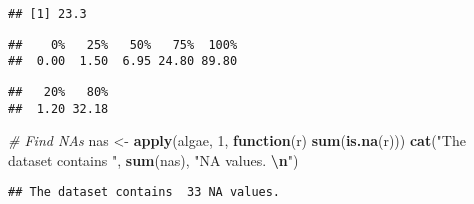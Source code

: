 \documentclass[
]{article}
\newenvironment{Shaded}{\begin{snugshade}}{\end{snugshade}}
\newcommand{\AttributeTok}[1]{\textcolor[rgb]{0.13,0.29,0.53}{#1}}
\newcommand{\CommentTok}[1]{\textcolor[rgb]{0.56,0.35,0.01}{\textit{#1}}}
\newcommand{\ControlFlowTok}[1]{\textcolor[rgb]{0.13,0.29,0.53}{\textbf{#1}}}
\newcommand{\DecValTok}[1]{\textcolor[rgb]{0.00,0.00,0.81}{#1}}
\newcommand{\FloatTok}[1]{\textcolor[rgb]{0.00,0.00,0.81}{#1}}
\newcommand{\FunctionTok}[1]{\textcolor[rgb]{0.13,0.29,0.53}{\textbf{#1}}}
\newcommand{\NormalTok}[1]{#1}
\newcommand{\OtherTok}[1]{\textcolor[rgb]{0.56,0.35,0.01}{#1}}
\newcommand{\SpecialCharTok}[1]{\textcolor[rgb]{0.81,0.36,0.00}{\textbf{#1}}}
\newcommand{\StringTok}[1]{\textcolor[rgb]{0.31,0.60,0.02}{#1}}
\begin{document}
\begin{Shaded}
\end{Shaded}

\begin{verbatim}
## [1] 23.3
\end{verbatim}

\begin{Shaded}
\end{Shaded}

\begin{verbatim}
##    0%   25%   50%   75%  100% 
##  0.00  1.50  6.95 24.80 89.80
\end{verbatim}

\begin{Shaded}
\end{Shaded}

\begin{verbatim}
##   20%   80% 
##  1.20 32.18
\end{verbatim}

\begin{Shaded}
\begin{Highlighting}[]
\CommentTok{\# Find NAs}
\NormalTok{nas }\OtherTok{\textless{}{-}} \FunctionTok{apply}\NormalTok{(algae, }\DecValTok{1}\NormalTok{, }\ControlFlowTok{function}\NormalTok{(r) }\FunctionTok{sum}\NormalTok{(}\FunctionTok{is.na}\NormalTok{(r)))}
\FunctionTok{cat}\NormalTok{(}\StringTok{"The dataset contains "}\NormalTok{, }\FunctionTok{sum}\NormalTok{(nas), }\StringTok{"NA values. }\SpecialCharTok{\textbackslash{}n}\StringTok{"}\NormalTok{)}
\end{Highlighting}
\end{Shaded}

\begin{verbatim}
## The dataset contains  33 NA values.
\end{verbatim}
\end{document}
